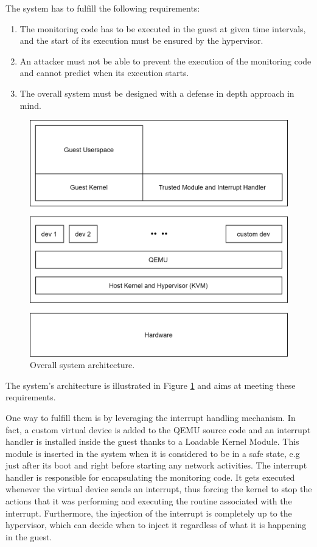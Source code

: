 The system has to fulfill the following requirements:
\begin{enumerate}
    \item The monitoring code has to be executed in the guest at given time intervals, and the start of its execution must be ensured by the hypervisor.
    \item An attacker must not be able to prevent the execution of the monitoring code and cannot predict when its execution starts.
    \item The overall system must be designed with a defense in depth approach in mind. 
\end{enumerate}
\begin{figure}
\centering
  \includegraphics[scale=1]{images/sys-arch.png}
  \caption{Overall system architecture. }
  \label{fig:system-architecture}
\end{figure}
The system's architecture is illustrated in Figure \ref{fig:system-architecture} and aims at meeting these requirements.
\par
One way to fulfill them is by leveraging the interrupt handling mechanism. In fact, a custom virtual device is added to the QEMU source code and an interrupt handler is installed inside the guest thanks to a Loadable Kernel Module. This module is inserted in the system when it is considered to be in a safe state, e.g just after its boot and right before starting any network activities. The interrupt handler is responsible for encapsulating the monitoring code. It gets executed whenever the virtual device sends an interrupt, thus forcing the kernel to stop the actions that it was performing and executing the routine associated with the interrupt. Furthermore, the injection of the interrupt is completely up to the hypervisor, which can decide when to inject it regardless of what it is happening in the guest. 
